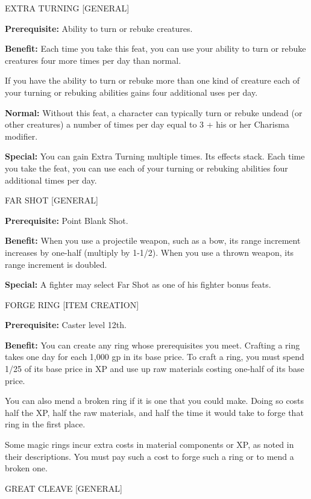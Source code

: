 \documentclass{article}
\begin{document}
\vspace{12pt}
EXTRA TURNING [GENERAL]

\textbf{Prerequisite:} Ability to turn or rebuke creatures.

\textbf{Benefit:} Each time you take this feat, you can use your ability to turn 
or rebuke creatures four more times per day than normal.

If you have the ability to turn or rebuke more than one kind of creature each of 
your turning or rebuking abilities gains four additional uses per day.

\textbf{Normal:} Without this feat, a character can typically turn or rebuke undead 
(or other creatures) a number of times per day equal to 3 + his or her Charisma 
modifier.

\textbf{Special:} You can gain Extra Turning multiple times. Its effects stack. 
Each time you take the feat, you can use each of your turning or rebuking abilities 
four additional times per day.

\vspace{12pt}
FAR SHOT [GENERAL]

\textbf{Prerequisite:} Point Blank Shot.

\textbf{Benefit:} When you use a projectile weapon, such as a bow, its range increment 
increases by one-half (multiply by 1-1/2). When you use a thrown weapon, its range 
increment is doubled.

\textbf{Special:} A fighter may select Far Shot as one of his fighter bonus feats.

\vspace{12pt}
FORGE RING [ITEM CREATION]

\textbf{Prerequisite:} Caster level 12th.

\textbf{Benefit:} You can create any ring whose prerequisites you meet. Crafting 
a ring takes one day for each 1,000 gp in its base price. To craft a ring, you 
must spend 1/25 of its base price in XP and use up raw materials costing one-half 
of its base price.

You can also mend a broken ring if it is one that you could make. Doing so costs 
half the XP, half the raw materials, and half the time it would take to forge that 
ring in the first place.

Some magic rings incur extra costs in material components or XP, as noted in their 
descriptions. You must pay such a cost to forge such a ring or to mend a broken 
one.

\vspace{12pt}
GREAT CLEAVE [GENERAL]
\end{document}
